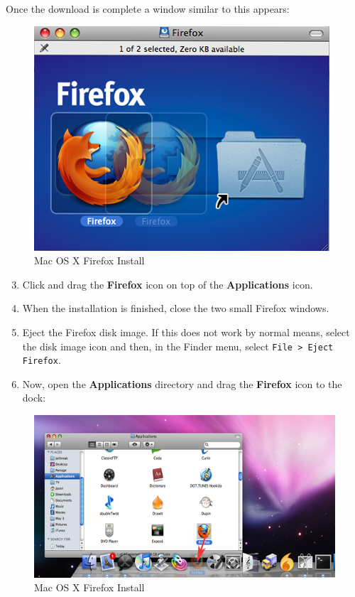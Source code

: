 Once the download is complete a window similar to this appears:

\begin{figure}[htbp]
\centering
\includegraphics{ff_mac_inst_3.png}
\caption{Mac OS X Firefox Install}
\end{figure}

\begin{enumerate}[1.]
\setcounter{enumi}{2}
\item
  Click and drag the \textbf{Firefox} icon on top of the
  \textbf{Applications} icon.
\item
  When the installation is finished, close the two small Firefox
  windows.
\item
  Eject the Firefox disk image. If this does not work by normal means,
  select the disk image icon and then, in the Finder menu, select
  \verb!File > Eject Firefox!.
\item
  Now, open the \textbf{Applications} directory and drag the
  \textbf{Firefox} icon to the dock:
\end{enumerate}
\begin{figure}[htbp]
\centering
\includegraphics{ff_mac_inst_4.png}
\caption{Mac OS X Firefox Install}
\end{figure}

